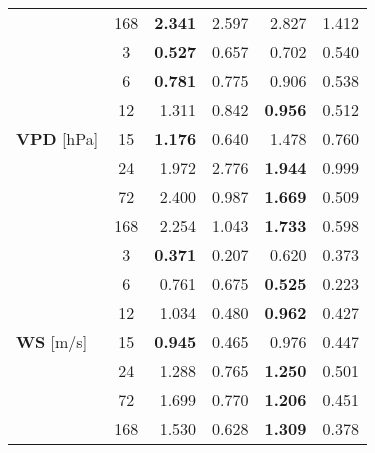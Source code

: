 \begin{tabular}{p{2.1cm}c|rr|rr}
{{{ & 168 & \bfseries 2.341 & 2.597 & 2.827 & 1.412 \\
\cline{1-6}
\multirow[c]{7}{*}{\parbox{2.1cm}{\textbf{VPD} [\si{hPa}]}} & 3 & \bfseries 0.527 & 0.657 & 0.702 & 0.540 \\
 & 6 & \bfseries 0.781 & 0.775 & 0.906 & 0.538 \\
 & 12 & 1.311 & 0.842 & \bfseries 0.956 & 0.512 \\
 & 15 & \bfseries 1.176 & 0.640 & 1.478 & 0.760 \\
 & 24 & 1.972 & 2.776 & \bfseries 1.944 & 0.999 \\
 & 72 & 2.400 & 0.987 & \bfseries 1.669 & 0.509 \\
 & 168 & 2.254 & 1.043 & \bfseries 1.733 & 0.598 \\
\cline{1-6}
\multirow[c]{7}{*}{\parbox{2.1cm}{\textbf{WS} [\si{m/s}]}} & 3 & \bfseries 0.371 & 0.207 & 0.620 & 0.373 \\
 & 6 & 0.761 & 0.675 & \bfseries 0.525 & 0.223 \\
 & 12 & 1.034 & 0.480 & \bfseries 0.962 & 0.427 \\
 & 15 & \bfseries 0.945 & 0.465 & 0.976 & 0.447 \\
 & 24 & 1.288 & 0.765 & \bfseries 1.250 & 0.501 \\
 & 72 & 1.699 & 0.770 & \bfseries 1.206 & 0.451 \\
 & 168 & 1.530 & 0.628 & \bfseries 1.309 & 0.378 \\
\cline{1-6}
\bottomrule
\end{tabular}
